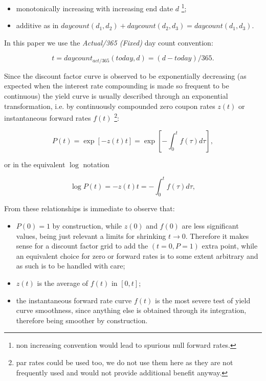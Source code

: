 \documentclass[11pt,reqno]{amsart}
\begin{document}
\begin{itemize}
\item monotonically increasing with increasing end date $d$ \footnote{non increasing convention would lead to spurious null forward rates.};

\item additive as in $daycount\left( d_{1},d_{2}\right) +daycount\left(
d_{2},d_{3}\right) =daycount\left( d_{1},d_{3}\right) $.
\end{itemize}

In this paper we use the \emph{Actual/365 (Fixed)} \cite{ISDA} day count convention:

\begin{equation*}
t=daycount_{act/365}\left( today,d\right) =\left( d-today\right) /365.
\end{equation*}

Since the discount factor curve is observed to be exponentially decreasing (as expected when the interest rate compounding is made so frequent to be continuous) the yield curve is usually described through an exponential transformation, i.e. by continuously compounded zero coupon rates $z(t)$ or instantaneous forward rates $f(t)$ \footnote{par rates could be used too, we do not use them here as they are not frequently used and would not provide additional benefit anyway.}:

\begin{equation}
P(t)=\exp \left[ -z\left( t\right) t\right] =\exp \left[ -\int_{0}^{t}f%
\left( \tau \right) d\tau \right] ,  \label{eqn:relationship}
\end{equation}

or in the equivalent $\log$ notation

\begin{equation}
\log P\left( t\right) =-z\left( t\right) t=-\int_{0}^{t}f(\tau )d\tau ,
\label{eqn:logrelationship}
\end{equation}

From these relationships is immediate to observe that:

\begin{itemize}
\item $P\left( 0\right) =1$ by construction, while $z\left( 0\right) $ and $f\left( 0\right) $ are less significant values, being just relevant a limits for shrinking $t\rightarrow 0$. Therefore it makes sense for a discount factor grid to add the $\left( t=0,P=1\right) $ extra point, while an equivalent choice for zero or forward rates is to some extent arbitrary and as such is to be handled with care;
\item $z\left( t\right) $ is the average of $f\left( t\right) $ in $\left[0,t\right] $;
\item the instantaneous forward rate curve $f\left( t\right) $ is the most severe test of yield curve smoothness, since anything else is obtained through its integration, therefore being smoother by construction.
\end{itemize}
\end{document}
